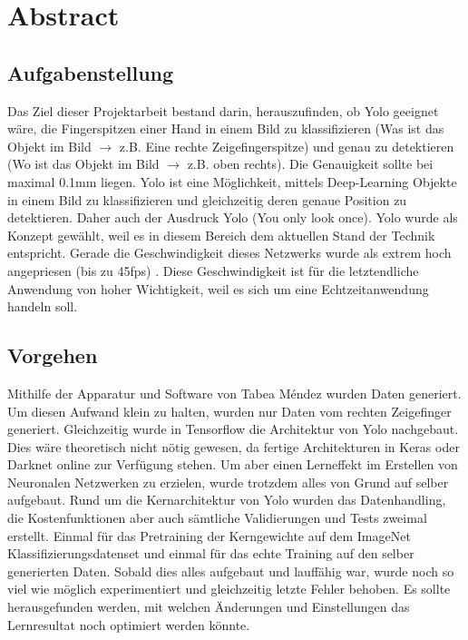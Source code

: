 \newpage
\section*{Abstract}
\subsection*{Aufgabenstellung}
Das Ziel dieser Projektarbeit bestand darin, herauszufinden, ob Yolo geeignet wäre, die Fingerspitzen einer Hand in einem Bild zu klassifizieren (Was ist das Objekt im Bild $\rightarrow$ z.B. Eine rechte Zeigefingerspitze) und genau zu detektieren (Wo ist das Objekt im Bild  $\rightarrow$ z.B. oben rechts). 
Die Genauigkeit sollte bei maximal 0.1mm liegen.
Yolo ist eine Möglichkeit, mittels Deep-Learning Objekte in einem Bild zu klassifizieren und gleichzeitig deren genaue Position zu detektieren. 
Daher auch der Ausdruck Yolo (You only look once).
Yolo wurde als Konzept gewählt, weil es in diesem Bereich dem aktuellen Stand der Technik \cite{yolo} entspricht. 
Gerade die Geschwindigkeit dieses Netzwerks wurde als extrem hoch angepriesen (bis zu 45fps) \cite{yolo}.
Diese Geschwindigkeit ist für die letztendliche Anwendung von hoher Wichtigkeit, weil es sich um eine Echtzeitanwendung handeln soll. 

\subsection*{Vorgehen}
Mithilfe der Apparatur und Software von Tabea Méndez \cite{TabeasFingertracking} wurden Daten generiert.
Um diesen Aufwand klein zu halten, wurden nur Daten vom rechten Zeigefinger generiert. 
Gleichzeitig wurde in Tensorflow die Architektur von Yolo nachgebaut. 
Dies wäre theoretisch nicht nötig gewesen, da fertige Architekturen in Keras oder Darknet online zur Verfügung stehen.
Um aber einen Lerneffekt im Erstellen von Neuronalen Netzwerken zu erzielen, wurde trotzdem alles von Grund auf selber aufgebaut. 
Rund um die Kernarchitektur von Yolo wurden das Datenhandling, die Kostenfunktionen aber auch sämtliche Validierungen und Tests zweimal erstellt.  
Einmal für das Pretraining der Kerngewichte auf dem ImageNet Klassifizierungsdatenset und einmal für das \grqq{}echte\grqq{} Training auf den selber generierten Daten. 
Sobald dies alles aufgebaut und lauffähig war, wurde noch so viel wie möglich experimentiert und gleichzeitig letzte Fehler behoben. 
Es sollte herausgefunden werden, mit welchen Änderungen und Einstellungen das Lernresultat noch optimiert werden könnte.    

